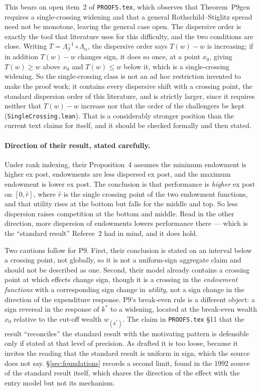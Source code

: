 \documentclass[11pt,a4paper]{article}
\begin{document}
This bears on open item~2 of \texttt{PROOFS.tex}, which observes that
Theorem~\textsf{P9gen} requires a single-crossing widening and that a general
Rothschild--Stiglitz spread need not be monotone, leaving the general case open.
The dispersive order is exactly the tool that literature uses for this
difficulty, and the two conditions are close. Writing $T = \Lambda_\beta^{-1}
\circ \Lambda_\alpha$, the dispersive order says $T(w) - w$ is increasing; if in
addition $T(w) - w$ changes sign, it does so once, at a point $x_0$, giving
$T(w) \geq w$ above $x_0$ and $T(w) \leq w$ below it, which is a single-crossing
widening. So the single-crossing class is not an ad hoc restriction invented to
make the proof work; it contains every dispersive shift with a crossing point,
the standard dispersion order of this literature, and is strictly larger,
since it requires neither that $T(w)-w$ increase nor that the order of the
challengers be kept (\texttt{SingleCrossing.lean}). That is a considerably stronger
position than the current text claims for itself, and it should be checked
formally and then stated.

\paragraph{Direction of their result, stated carefully.} Under rank indexing,
their Proposition~4 assumes the minimum endowment is higher ex post, endowments
are less dispersed ex post, and the maximum endowment is lower ex post. The
conclusion is that performance is \emph{higher} ex post on $[0, \hat r]$, where
$\hat r$ is the single crossing point of the two endowment functions, and that
utility rises at the bottom but falls for the middle and top. So less dispersion
raises competition at the bottom and middle. Read in the other direction, more
dispersion of endowments lowers performance there --- which is the ``standard
result'' Referee~2 had in mind, and it does hold.

Two cautions follow for P9. First, their conclusion is stated on an interval
below a crossing point, not globally, so it is not a uniform-sign aggregate
claim and should not be described as one. Second, their model already contains a
crossing point at which effects change sign, though it is a crossing in the
\emph{endowment functions} with a corresponding sign change in \emph{utility},
not a sign change in the direction of the expenditure response. P9's break-even
rule is a different object: a sign reversal in the response of $k^*$ to a
widening, located at the break-even wealth $x_0$ relative to the cut-off wealth
$w_{(k^*)}$. The claim in \texttt{PROOFS.tex} \S11 that the result
``reconciles'' the standard result with the motivating pattern is defensible
only if stated at that level of precision. As drafted it is too loose, because
it invites the reading that the standard result is uniform in sign, which the
source does not say. \S\ref{sec:foundations} records a second limit, found in
the 1992 source of the standard result itself, which shares the direction of
the effect with the entry model but not its mechanism.
\end{document}

